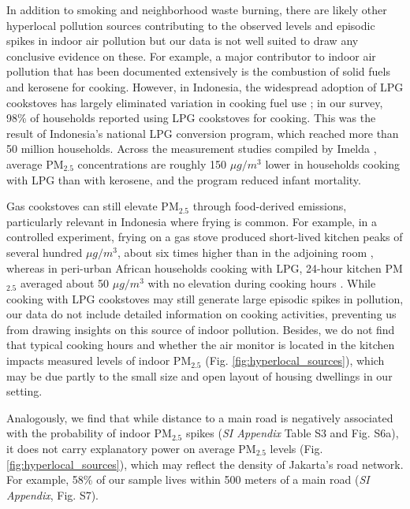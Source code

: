 \documentclass[9pt,twocolumn,twoside]{pnas-new}
\begin{document}
In addition to smoking and neighborhood waste burning, there are likely other hyperlocal pollution sources contributing to the observed levels and episodic spikes in indoor air pollution but our data is not well suited to draw any conclusive evidence on these. For example, a major contributor to indoor air pollution that has been documented extensively is the combustion of solid fuels and kerosene for cooking. However, in Indonesia, the widespread adoption of LPG cookstoves has largely eliminated variation in cooking fuel use \citep{astuti_successful_2019}; in our survey, 98\% of households reported using LPG cookstoves for cooking. 
This was the result of Indonesia's national LPG conversion program, which reached more than 50 million households. Across the measurement studies compiled by Imelda \citep{Imelda2020}, average PM$_{2.5}$ concentrations are roughly 150 $\mu g/m^3$ lower in households cooking with LPG than with kerosene, and the program reduced infant mortality.

Gas cookstoves can still elevate PM$_{2.5}$ through food-derived emissions, particularly relevant in Indonesia where frying is common. For example, in a controlled experiment, frying on a gas stove produced short-lived kitchen peaks of several hundred $\mu g/m^3$, about six times higher than in the adjoining room \citep{Huboyo2011}, whereas in peri-urban African households cooking with LPG, 24-hour kitchen PM$_{2.5}$ averaged about 50 $\mu g/m^3$ with no elevation during cooking hours \citep{Shupler2024}.
While cooking with LPG cookstoves may still generate large episodic spikes in pollution, our data do not include detailed information on cooking activities, preventing us from drawing insights on this source of indoor pollution. Besides, we do not find that typical cooking hours and whether the air monitor is located in the kitchen impacts measured levels of indoor PM$_{2.5}$ (Fig. \ref{fig:hyperlocal_sources}), which may be due partly to the small size and open layout of housing dwellings in our setting. 



Analogously, we find that while distance to a main road is negatively associated with the probability of indoor PM$_{2.5}$ spikes (\textit{SI Appendix} Table S3 and Fig. S6a), it does not carry explanatory power on average PM$_{2.5}$ levels (Fig. \ref{fig:hyperlocal_sources}), which may reflect the density of Jakarta’s road network. For example, 58\% of our sample lives within 500 meters of a main road (\textit{SI Appendix}, Fig. S7).
\end{document}
